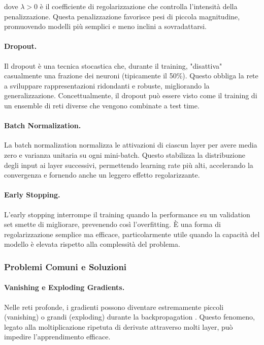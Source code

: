 dove $\lambda > 0$ è il coefficiente di regolarizzazione che controlla l'intensità della penalizzazione. Questa penalizzazione favorisce pesi di piccola magnitudine, promuovendo mo\-del\-li più semplici e meno inclini a sovradattarsi.

\paragraph{Dropout.} 
Il dropout \cite{srivastava2014dropout} è una tecnica stocastica che, durante il training, "disattiva" casualmente una frazione dei neuroni (tipicamente il 50\%). Questo obbliga la rete a sviluppare rappresentazioni ridondanti e robuste, migliorando la generalizzazione. Concettualmente, il dropout può essere visto come il training di un ensemble di reti diverse che vengono combinate a test time.

\paragraph{Batch Normalization.} 
La batch normalization \cite{ioffe2015batch} normalizza le attivazioni di ciascun layer per avere media zero e varianza unitaria su ogni mini-batch. Questo stabilizza la distribuzione degli input ai layer successivi, permettendo learning rate più alti, accelerando la convergenza e fornendo anche un leggero effetto regolarizzante.

\paragraph{Early Stopping.} 
L'early stopping \cite{prechelt1998early} interrompe il training quando la performance su un validation set smette di migliorare, prevenendo così l'overfitting. È una forma di regolarizzazione semplice ma efficace, particolarmente utile quando la capacità del modello è elevata rispetto alla complessità del problema.

\subsubsection{Problemi Comuni e Soluzioni}

\paragraph{Vanishing e Exploding Gradients.} 
Nelle reti profonde, i gradienti possono diventare estremamente piccoli (vanishing) o grandi (exploding) durante la backpropagation \cite{hochreiter1991untersuchungen, bengio1994learning}. Questo fenomeno, legato alla moltiplicazione ripetuta di derivate attraverso molti layer, può impedire l'apprendimento efficace.

